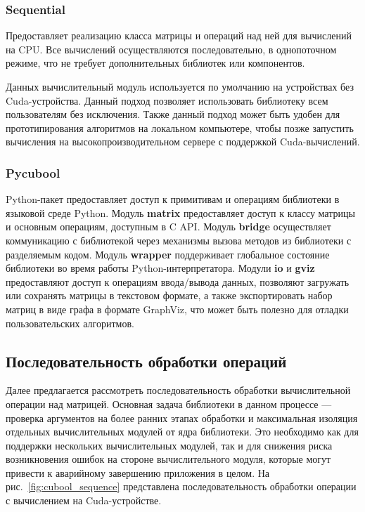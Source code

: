 \subsubsection*{Sequential}

Предоставляет реализацию класса матрицы и операций над ней для вычислений на CPU. Все вычислений осуществляются последовательно, в однопоточном режиме, что не требует дополнительных библиотек или компонентов.

Данных вычислительный модуль используется по умолчанию на устройствах без Cuda-устройства. 
Данный подход позволяет использовать библиотеку всем пользователям без исключения. 
Также данный подход может быть удобен для прототипирования алгоритмов на локальном компьютере, 
чтобы позже запустить вычисления на высокопроизводительном сервере с поддержкой Cuda-вычислений.

\subsubsection*{Pycubool}

Python-пакет предоставляет доступ к примитивам и операциям библиотеки в языковой среде Python.
Модуль \textbf{matrix} предоставляет доступ к классу матрицы и основным операциям, доступным в C API.
Модуль \textbf{bridge} осуществляет коммуникацию с библиотекой через механизмы вызова методов из библиотеки с разделяемым кодом. 
Модуль \textbf{wrapper} поддерживает глобальное состояние библиотеки во время работы Python-интерпретатора. 
Модули \textbf{io} и \textbf{gviz} предоставляют доступ к операциям ввода/вывода данных, 
позволяют загружать или сохранять матрицы в текстовом формате, 
а также экспортировать набор матриц в виде графа в формате GraphViz, 
что может быть полезно для отладки пользовательских алгоритмов.

\subsection{Последовательность обработки операций}

Далее предлагается рассмотреть последовательность обработки вычислительной операции над матрицей. 
Основная задача библиотеки в данном процессе --- проверка аргументов на более ранних этапах обработки и максимальная изоляция отдельных вычислительных модулей от ядра библиотеки. 
Это необходимо как для поддержки нескольких вычислительных модулей, так и для снижения риска возникновения ошибок на стороне вычислительного модуля, которые могут привести к аварийному завершению приложения в целом. 
На рис.~\ref{fig:cubool_sequence} представлена последовательность обработки операции с вычислением на Cuda-устройстве. 

